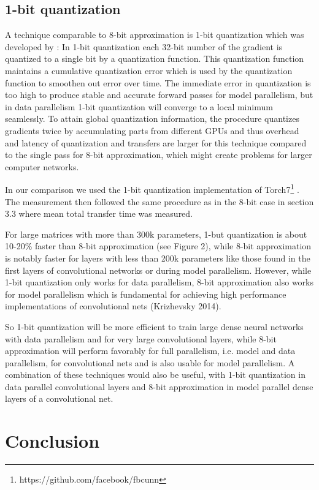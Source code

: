 \documentclass{article} %
\begin{document}
\subsection{1-bit quantization}
A technique comparable to 8-bit approximation is 1-bit quantization which was developed by \citet{seide20141}: In 1-bit quantization each 32-bit number of the gradient is quantized to a single bit by a quantization function. This quantization function maintains a cumulative quantization error which is used by the quantization function to smoothen out error over time. The immediate error in quantization is too high to produce stable and accurate forward passes for model parallelism, but in data parallelism 1-bit quantization will converge to a local minimum seamlessly. To attain global quantization information, the procedure quantizes gradients twice by accumulating parts from different GPUs and thus overhead and latency of quantization and transfers are larger for this technique compared to the single pass for 8-bit approximation, which might create problems for larger computer networks.

In our comparison we used the 1-bit quantization implementation of Torch7\footnote{https://github.com/facebook/fbcunn} \citep{collobert2011torch7}. The measurement then followed the same procedure as in the 8-bit case in section 3.3 where mean total transfer time was measured.

For large matrices with more than 300k parameters, 1-but quantization is about 10-20\% faster than 8-bit approximation (see Figure 2), while 8-bit approximation is notably faster for layers with less than 200k parameters like those found in the first layers of convolutional networks or during model parallelism. However, while 1-bit quantization only works for data parallelism, 8-bit approximation also works for model parallelism which is fundamental for achieving high performance implementations of convolutional nets (Krizhevsky 2014). 

So 1-bit quantization will be more efficient to train large dense neural networks with data parallelism and for very large convolutional layers, while 8-bit approximation will perform favorably for full parallelism, i.e. model and data parallelism, for convolutional nets and is also usable for model parallelism. A combination of these techniques would also be useful, with 1-bit quantization in data parallel convolutional layers and 8-bit approximation in model parallel dense layers of a convolutional net. 

\section*{Conclusion}
\end{document}
